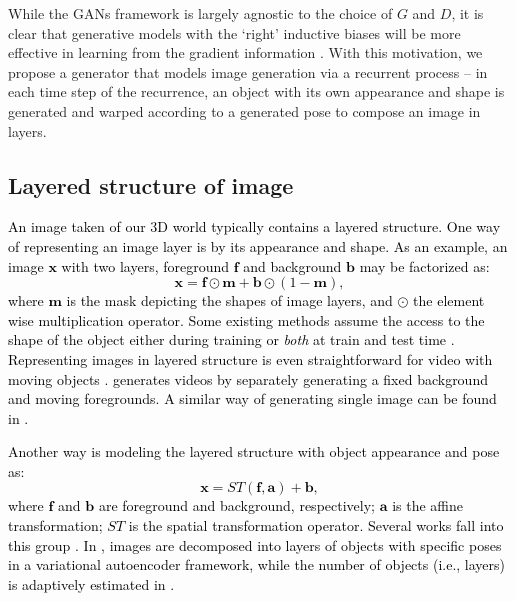 \documentclass{article} \usepackage{iclr2017_conference,times}
\begin{document}
While the GANs framework is largely agnostic to the choice of $G$ and $D$, it is clear that generative models with the `right' inductive biases will be more effective in learning from the gradient information \citep{LAPGAN,GRAN,GDG+15,WWGAN,YanYSL15}. With this motivation, we propose a generator that models image generation via a recurrent process -- in each time step of the recurrence, an object with its own appearance and shape is generated and warped according to a generated pose to compose an image in layers.

\subsection{Layered structure of image}
\label{sec:layer}
\textcolor{black}{An image taken of our 3D world typically contains a layered structure. One way of representing an image layer is by its appearance and shape. As an example, an image $\bm{x}$ with two layers, foreground $\bm{f}$ and background $\bm{b}$ may be factorized as:
\begin{equation} 
\bm{x} = \bm{f}  \odot  \bm{m} +\bm{b} \odot (1-\bm{m}), \label{eq:as}
\end{equation}
where $\bm{m}$ is the mask depicting the shapes of image layers, and $\odot$ the element wise multiplication operator. Some existing methods assume the access to the shape of the object either during training \citep{isola2013scene} or \emph{both} at train and test time \citep{WWGAN,YanYSL15}. Representing images in layered structure is even straightforward for video with moving objects \citep{TP16, WA94, KJF05}. \cite{VideoGAN} generates videos by separately generating a fixed background and moving foregrounds. A similar way of generating single image can be found in \cite{CompositeGAN}.}

\textcolor{black}{Another way is modeling the layered structure with object appearance and pose as:
\begin{equation} 
\bm{x} = ST(\bm{f}, \bm{a})+ \bm{b}, \label{eq:ap} \end{equation}
where $\bm{f}$ and $\bm{b}$ are foreground and background, respectively; $\bm{a}$ is the affine transformation; $ST$ is the spatial transformation operator. Several works fall into this group \citep{RHS+11, HM15, EHWTKH16}. In \cite{HM15}, images are decomposed into layers of objects with specific poses in a variational autoencoder framework, while the number of objects (i.e., layers) is adaptively estimated in \cite{EHWTKH16}.}
\end{document}

